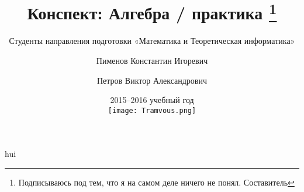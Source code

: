 \documentclass[a4paper,titlepage]{article}
\author{Студенты направления подготовки «Математика и Теоретическая информатика»
  \and Пименов Константин Игоревич
  \and Петров Виктор Александрович}
\title{Конспект: Алгебра / практика
  \thanks{Подписываюсь под тем, что я на самом деле ничего не понял. Составитель}}
\date{2015--2016 учебный год \\ \vspace{1.3cm}
\texttt{[image: Tramvous.png]}}
\begin{document}
\maketitle

\tableofcontents
\vfill\eject
hui









\end{document}
